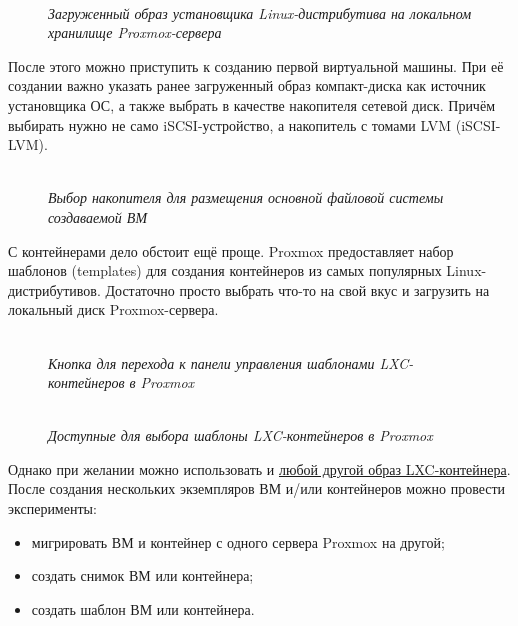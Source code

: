 \documentclass[14pt, a4paper]{article}
\begin{document}
\begin{figure}[h]
    \centering
    \\
    \small\textit{Загруженный образ установщика Linux-дистрибутива на локальном хранилище Proxmox-сервера}  
    \label{framework} 
\end{figure}

После этого можно приступить к созданию первой виртуальной машины. При её создании важно
указать ранее загруженный образ компакт-диска как источник установщика ОС, а также выбрать в
качестве накопителя сетевой диск. Причём выбирать нужно не само iSCSI-устройство, а накопитель с
томами LVM (iSCSI-LVM).

\newpage

\begin{figure}[h]
    \centering
    \\
    \small\textit{Выбор накопителя для размещения основной файловой системы создаваемой ВМ}  
    \label{framework} 
\end{figure}

С контейнерами дело обстоит ещё проще. Proxmox предоставляет набор шаблонов (templates) для
создания контейнеров из самых популярных Linux-дистрибутивов. Достаточно просто выбрать что-то
на свой вкус и загрузить на локальный диск Proxmox-сервера.

\begin{figure}[h]
    \centering
    \\
    \small\textit{Кнопка для перехода к панели управления шаблонами LXC-контейнеров в Proxmox}  
    \label{framework} 
\end{figure}

\begin{figure}[h]
    \centering
    \\
    \small\textit{Доступные для выбора шаблоны LXC-контейнеров в Proxmox}  
    \label{framework} 
\end{figure}

Однако при желании можно использовать и \href{https://uk.lxd.images.canonical.com/images/}{любой другой образ LXC-контейнера}.\\

После создания нескольких экземпляров ВМ и/или контейнеров можно провести эксперименты:

\begin{itemize}
    \item мигрировать ВМ и контейнер с одного сервера Proxmox на другой;
    \item создать снимок ВМ или контейнера;
    \item создать шаблон ВМ или контейнера.
\end{itemize}
\end{document}
